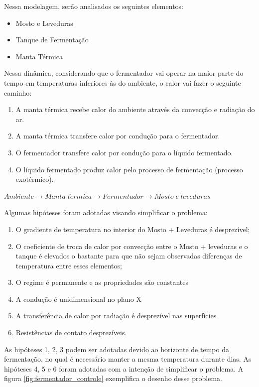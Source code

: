 Nessa modelagem, serão analisados os seguintes elementos: 
\begin{itemize}
    \item Mosto e Leveduras 
    \item Tanque de Fermentação 
    \item Manta Térmica 
\end{itemize}

Nessa dinâmica, considerando que o fermentador vai operar na maior parte do tempo em temperaturas inferiores às do ambiente, o calor vai fazer o seguinte caminho:
\begin{enumerate}
    \item A manta térmica recebe calor do ambiente através da convecção e radiação do ar. 
    \item A manta térmica transfere calor por condução para o fermentador. 
    \item O fermentador transfere calor por condução para o líquido fermentado. 
    \item O líquido fermentado produz calor pelo processo de fermentação (processo exotérmico).
\end{enumerate}

\begin{center}
    \(Ambiente \longrightarrow Manta\;t\acute{e}rmica \longrightarrow Fermentador \longrightarrow Mosto\;e\;leveduras\)
\end{center}



    
Algumas hipóteses foram adotadas visando simplificar o problema: 

\begin{enumerate}
    \item O gradiente de temperatura no interior do Mosto + Leveduras é desprezível; 
    \item O coeficiente de troca de calor por convecção entre o Mosto + leveduras e o tanque é elevados o bastante para que não sejam observadas diferenças de temperatura entre esses elementos; 
    \item O regime é permanente e as propriedades são constantes 
    \item A condução é unidimensional no plano X
    \item A transferência de calor por radiação é desprezível nas superfícies 
    \item Resistências de contato desprezíveis.
\end{enumerate}


As hipóteses 1, 2, 3  podem ser adotadas devido ao horizonte de tempo da fermentação, no qual é necessário manter a mesma temperatura durante dias. As hipóteses 4, 5 e 6 foram adotadas com a intenção de simplificar o problema. A figura \ref{fig:fermentador_controle} exemplifica o desenho desse problema.

